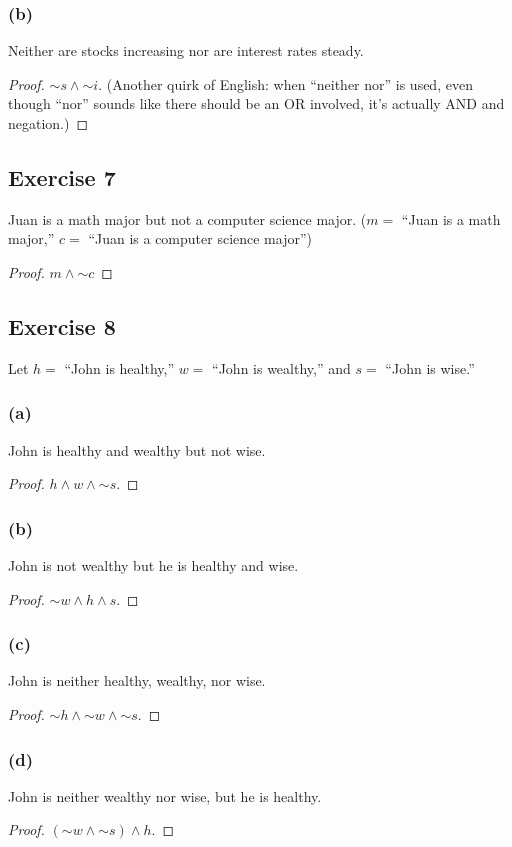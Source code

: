 \documentclass[14pt]{extarticle}
\begin{document}
\subsubsection{(b)} Neither are stocks increasing nor are interest rates steady.
\begin{proof} ${\sim s} \wedge {\sim i}$.
(Another quirk of English: when ``neither nor'' is used, even though ``nor''
sounds like there should be an OR involved, it's actually AND and negation.)
\end{proof}

\subsection{Exercise 7} Juan is a math major but not a computer science major.
($m =$ “Juan is a math major,” $c =$ “Juan is a computer science major”)

\begin{proof} $m \wedge {\sim c}$ \end{proof}
\subsection{Exercise 8} Let $h =$ “John is healthy,” $w =$ “John is wealthy,”
and $s =$ “John is wise.”

\subsubsection{(a)} John is healthy and wealthy but not wise.
\begin{proof} $h \wedge w \wedge {\sim s}$. \end{proof}
\subsubsection{(b)} John is not wealthy but he is healthy and wise.
\begin{proof} ${\sim w} \wedge h \wedge s$. \end{proof}
\subsubsection{(c)} John is neither healthy, wealthy, nor wise.
\begin{proof} ${\sim h} \wedge {\sim w} \wedge {\sim s}$. \end{proof}
\subsubsection{(d)} John is neither wealthy nor wise, but he is healthy.
\begin{proof} $({\sim w} \wedge {\sim s}) \wedge h$. \end{proof}
\end{document}
